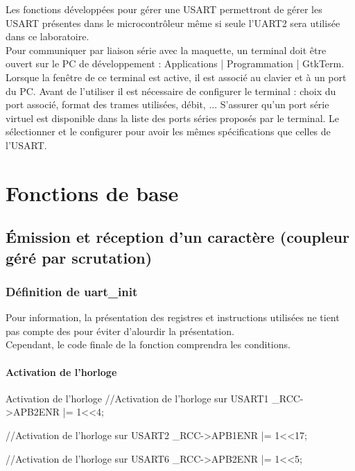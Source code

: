 {Les fonctions développées pour gérer une USART permettront de gérer les USART présentes dans
le microcontrôleur même si seule l'UART2 sera utilisée dans ce laboratoire. \\

Pour communiquer par liaison série avec la maquette, un terminal doit être ouvert sur le PC
de développement : Applications | Programmation | GtkTerm. \\
Lorsque la fenêtre de ce terminal est active, il est associé au clavier et à un port du PC. Avant de l'utiliser il est nécessaire de configurer le terminal : choix du port associé, format des trames utilisées, débit, ... S'assurer qu'un port série virtuel est disponible dans la liste des ports séries proposés par le terminal. Le sélectionner et le configurer pour avoir les mêmes spécifications que celles de l'USART.\\

\chapter{Fonctions de base}

\section{Émission et réception d'un caractère (coupleur géré par scrutation)}

\subsection{Définition de uart\_init}

Pour information, la présentation des registres et instructions utilisées ne tient pas compte des  pour éviter d'alourdir la présentation.\\
Cependant, le code finale de la fonction  comprendra les conditions.


\subsubsection{Activation de l'horloge}

\begin{Cpp}{Activation de l'horloge} 
//Activation de l'horloge sur USART1
_RCC->APB2ENR |= 1<<4;

//Activation de l'horloge sur USART2
_RCC->APB1ENR |= 1<<17;

//Activation de l'horloge sur USART6
_RCC->APB2ENR |= 1<<5;
\end{Cpp}

}
